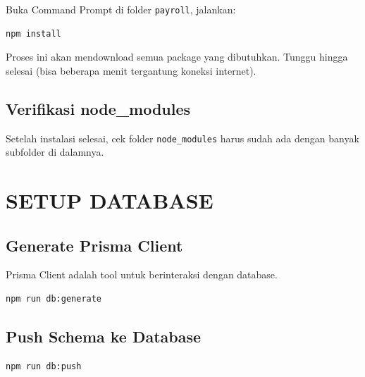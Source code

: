 \documentclass[12pt,a4paper]{article}
\begin{document}
Buka Command Prompt di folder \texttt{payroll}, jalankan:

\begin{lstlisting}[language=bash]
npm install
\end{lstlisting}

Proses ini akan mendownload semua package yang dibutuhkan. Tunggu hingga selesai (bisa beberapa menit tergantung koneksi internet).

\subsection{Verifikasi node\_modules}
Setelah instalasi selesai, cek folder \texttt{node\_modules} harus sudah ada dengan banyak subfolder di dalamnya.

\begin{center}
\end{center}

\newpage
\section{SETUP DATABASE}

\subsection{Generate Prisma Client}

Prisma Client adalah tool untuk berinteraksi dengan database.

\begin{lstlisting}[language=bash]
npm run db:generate
\end{lstlisting}

\subsection{Push Schema ke Database}

\begin{lstlisting}[language=bash]
npm run db:push
\end{lstlisting}
\end{document}
